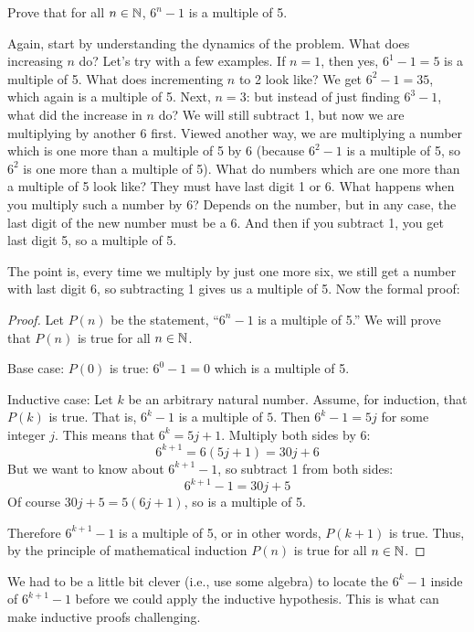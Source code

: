 \documentclass[12pt]{article}
\begin{document}
 \begin{example}
   Prove that for all $n \in \mathbb N$, $6^n - 1$ is a multiple of 5.
   \begin{solution}
   Again, start by understanding the dynamics of the problem.  What does increasing $n$ do?  Let's try with a few examples.  If $n = 1$, then yes, $6^1 - 1 = 5$ is a multiple of 5.  What does incrementing $n$ to 2 look like?  We get $6^2 - 1 = 35$, which again is a multiple of 5.  Next, $n = 3$: but instead of just finding $6^3 - 1$, what did the increase in $n$ do?  We will still subtract 1, but now we are multiplying by another 6 first.  Viewed another way, we are multiplying a number which is one more than a multiple of 5 by 6 (because $6^2 - 1$ is a multiple of 5, so $6^2$ is one more than a multiple of 5).  What do numbers which are one more than a multiple of 5 look like?  They must have last digit 1 or 6.  What happens when you multiply such a number by 6?  Depends on the number, but in any case, the last digit of the new number must be a 6.  And then if you subtract 1, you get last digit 5, so a multiple of 5.  
   
   The point is, every time we multiply by just one more six, we still get a number with last digit 6, so subtracting 1 gives us a multiple of 5. Now the formal proof:
   
   \begin{proof}
     Let $P(n)$ be the statement, ``$6^n - 1$ is a multiple of 5.''  We will prove that $P(n)$ is true for all $n \in \mathbb N$.
     
     Base case: $P(0)$ is true: $6^0 -1 = 0$ which is a multiple of 5.
     
     Inductive case: Let $k$ be an arbitrary natural number.  Assume, for induction, that $P(k)$ is true.  That is, $6^k - 1$ is a multiple of $5$.  Then $6^k - 1 = 5j$ for some integer $j$.  This means that $6^k = 5j + 1$.  Multiply both sides by $6$: 
     \[6^{k+1} = 6(5j+1) = 30j + 6\]
     But we want to know about $6^{k+1} - 1$, so subtract 1 from both sides:
     \[6^{k+1} - 1 = 30j + 5\]
     Of course $30j+5 = 5(6j+1)$, so is a multiple of 5.

     Therefore $6^{k+1} - 1$ is a multiple of 5, or in other words, $P(k+1)$ is true.  Thus, by the principle of mathematical induction $P(n)$ is true for all $n \in \mathbb N$.
   \end{proof}
   \end{solution}
 \end{example}

We had to be a little bit clever (i.e., use some algebra) to locate the $6^k - 1$ inside of $6^{k+1} - 1$ before we could apply the inductive hypothesis.  This is what can make inductive proofs challenging.  
\end{document}
